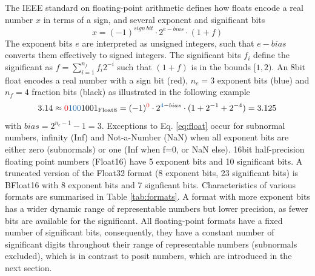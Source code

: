 \documentclass[draft]{agujournal2019}
\newcommand{\op}{\operatorname}
\begin{document}
The IEEE standard on floating-point arithmetic defines how floats encode a real number $x$ in terms of a sign, and several exponent and significant bits
\begin{equation}
x = (-1)^{sign~bit} \cdot 2^{e-bias} \cdot (1+f)
\label{eq:float}
\end{equation}
The exponent bits $e$ are interpreted as unsigned integers, such that $e-bias$ converts them effectively to signed integers. The significant bits $f_i$ define the significant as $f = \sum_{i=1}^{n_f} f_i 2^{-i}$ such that $(1+f)$ is in the bounds $[1,2)$. An 8bit float encodes a real number with a sign bit (red), $n_e = 3$ exponent bits (blue) and $n_f=4$ fraction bits (black) as illustrated in the following example
\begin{equation}
3.14 \approx {\color{psign}0}{\color{pexpo}100}1001_{\op{Float8}} = (-1)^{\color{psign}0} \cdot 2^{{\color{pexpo}4}-bias} \cdot (1+2^{-1}+2^{-4}) = 3.125
\label{eq:posit_pos}
\end{equation}
with $bias=2^{n_e-1} - 1 = 3$. Exceptions to Eq. \ref{eq:float} occur for subnormal numbers, infinity (Inf) and Not-a-Number (NaN) when all exponent bits are either zero (subnormals) or one (Inf when f=0, or NaN else). 16bit half-precision floating point numbers (Float16) have 5 exponent bits and 10 significant bits. A truncated version of the Float32 format (8 exponent bits, 23 significant bits) is BFloat16 with 8 exponent bits and 7 signficant bits. Characteristics of various formats are summarised in Table \ref{tab:formats}. A format with more exponent bits has a wider dynamic range of representable numbers but lower precision, as fewer bits are available for the significant. All floating-point formats have a fixed number of significant bits, consequently, they have a constant number of significant digits throughout their range of representable numbers (subnormals excluded), which is in contrast to posit numbers, which are introduced in the next section.
\end{document}
